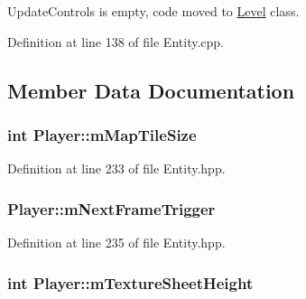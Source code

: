 Update\-Controls is empty, code moved to \hyperlink{class_level}{Level} class. 



Definition at line 138 of file Entity.\-cpp.



\subsection{Member Data Documentation}
\hypertarget{class_player_a8edce47b376093a95a89c91eee9b253e}{
\subsubsection[{m\-Map\-Tile\-Size}]{\setlength{\rightskip}{0pt plus 5cm}int Player\-::m\-Map\-Tile\-Size\hspace{0.3cm}{\ttfamily [protected]}}}\label{class_player_a8edce47b376093a95a89c91eee9b253e}


Definition at line 233 of file Entity.\-hpp.

\hypertarget{class_player_a97ef6ab1b525c97f0e4fdd9ece101b03}{
\subsubsection[{m\-Next\-Frame\-Trigger}]{ Player\-::m\-Next\-Frame\-Trigger\hspace{0.3cm}{\ttfamily [protected]}}}\label{class_player_a97ef6ab1b525c97f0e4fdd9ece101b03}


Definition at line 235 of file Entity.\-hpp.

\hypertarget{class_player_a9d15c816285b1708e3a93ef41a628263}{
\subsubsection[{m\-Texture\-Sheet\-Height}]{\setlength{\rightskip}{0pt plus 5cm}int Player\-::m\-Texture\-Sheet\-Height\hspace{0.3cm}{\ttfamily [protected]}}}\label{class_player_a9d15c816285b1708e3a93ef41a628263}


